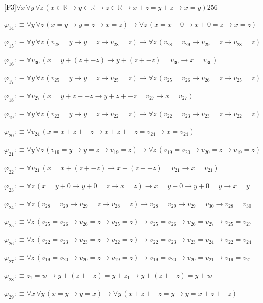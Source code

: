 \begin{fullproof}{[F3]}{$\forall x\,\forall y\,\forall z\,(x \in \mathbb{R} \to y \in \mathbb{R} \to z \in \mathbb{R} \to x + z = y + z \to x = y)$}{256}
\begin{abbrevlist}
\item $\varphi_{14} :\equiv \forall y\,\forall z\,(x = y \to y = z \to x = z) \to \forall z\,(x = x + 0 \to x + 0 = z \to x = z)$
\item $\varphi_{15} :\equiv \forall y\,\forall z\,(v_{28} = y \to y = z \to v_{28} = z) \to \forall z\,(v_{28} = v_{29} \to v_{29} = z \to v_{28} = z)$
\item $\varphi_{16} :\equiv \forall v_{30}\,(x = y + (z + -z) \to y + (z + -z) = v_{30} \to x = v_{30})$
\item $\varphi_{17} :\equiv \forall y\,\forall z\,(v_{25} = y \to y = z \to v_{25} = z) \to \forall z\,(v_{25} = v_{26} \to v_{26} = z \to v_{25} = z)$
\item $\varphi_{18} :\equiv \forall v_{27}\,(x = y + z + -z \to y + z + -z = v_{27} \to x = v_{27})$
\item $\varphi_{19} :\equiv \forall y\,\forall z\,(v_{22} = y \to y = z \to v_{22} = z) \to \forall z\,(v_{22} = v_{23} \to v_{23} = z \to v_{22} = z)$
\item $\varphi_{20} :\equiv \forall v_{24}\,(x = x + z + -z \to x + z + -z = v_{24} \to x = v_{24})$
\item $\varphi_{21} :\equiv \forall y\,\forall z\,(v_{19} = y \to y = z \to v_{19} = z) \to \forall z\,(v_{19} = v_{20} \to v_{20} = z \to v_{19} = z)$
\item $\varphi_{22} :\equiv \forall v_{21}\,(x = x + (z + -z) \to x + (z + -z) = v_{21} \to x = v_{21})$
\item $\varphi_{23} :\equiv \forall z\,(x = y + 0 \to y + 0 = z \to x = z) \to x = y + 0 \to y + 0 = y \to x = y$
\item $\varphi_{24} :\equiv \forall z\,(v_{28} = v_{29} \to v_{29} = z \to v_{28} = z) \to v_{28} = v_{29} \to v_{29} = v_{30} \to v_{28} = v_{30}$
\item $\varphi_{25} :\equiv \forall z\,(v_{25} = v_{26} \to v_{26} = z \to v_{25} = z) \to v_{25} = v_{26} \to v_{26} = v_{27} \to v_{25} = v_{27}$
\item $\varphi_{26} :\equiv \forall z\,(v_{22} = v_{23} \to v_{23} = z \to v_{22} = z) \to v_{22} = v_{23} \to v_{23} = v_{24} \to v_{22} = v_{24}$
\item $\varphi_{27} :\equiv \forall z\,(v_{19} = v_{20} \to v_{20} = z \to v_{19} = z) \to v_{19} = v_{20} \to v_{20} = v_{21} \to v_{19} = v_{21}$
\item $\varphi_{28} :\equiv z_{1} = w \to y + (z + -z) = y + z_{1} \to y + (z + -z) = y + w$
\item $\varphi_{29} :\equiv \forall x\,\forall y\,(x = y \to y = x) \to \forall y\,(x + z + -z = y \to y = x + z + -z)$

\end{abbrevlist}
\end{fullproof}

